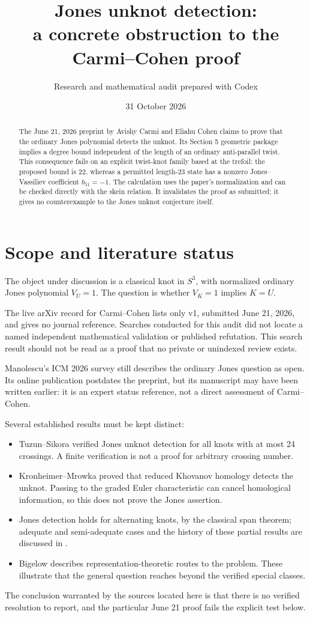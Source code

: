 \documentclass[11pt]{article}
\title{Jones unknot detection:\\a concrete obstruction to the Carmi--Cohen proof}
\author{Research and mathematical audit prepared with Codex}
\date{31 October 2026}
\begin{document}
\maketitle
\begin{abstract}
The June 21, 2026 preprint by Avishy Carmi and Eliahu Cohen claims to prove that the ordinary Jones polynomial detects the unknot. Its Section 5 geometric package implies a degree bound independent of the length of an ordinary anti-parallel twist. This consequence fails on an explicit twist-knot family based at the trefoil: the proposed bound is 22, whereas a permitted length-23 state has a nonzero Jones--Vassiliev coefficient $b_{51}=-1$. The calculation uses the paper's normalization and can be checked directly with the skein relation. It invalidates the proof as submitted; it gives no counterexample to the Jones unknot conjecture itself.
\end{abstract}

\section*{Scope and literature status}
The object under discussion is a classical knot in $S^3$, with normalized ordinary Jones polynomial $V_U=1$. The question is whether $V_K=1$ implies $K=U$.

The live arXiv record for Carmi--Cohen \cite{CC} lists only v1, submitted June 21, 2026, and gives no journal reference. Searches conducted for this audit did not locate a named independent mathematical validation or published refutation. This search result should not be read as a proof that no private or unindexed review exists.

Manolescu's ICM 2026 survey \cite{Manolescu} still describes the ordinary Jones question as open. Its online publication postdates the preprint, but its manuscript may have been written earlier: it is an expert status reference, not a direct assessment of Carmi--Cohen.

Several established results must be kept distinct:
\begin{itemize}
\item Tuzun--Sikora \cite{TS} verified Jones unknot detection for all knots with at most 24 crossings. A finite verification is not a proof for arbitrary crossing number.
\item Kronheimer--Mrowka \cite{KM} proved that reduced Khovanov homology detects the unknot. Passing to the graded Euler characteristic can cancel homological information, so this does not prove the Jones assertion.
\item Jones detection holds for alternating knots, by the classical span theorem; adequate and semi-adequate cases and the history of these partial results are discussed in \cite{AL}.
\item Bigelow \cite{Bigelow} describes representation-theoretic routes to the problem. These illustrate that the general question reaches beyond the verified special classes.
\end{itemize}
The conclusion warranted by the sources located here is that there is no verified resolution to report, and the particular June 21 proof fails the explicit test below.
\end{document}
